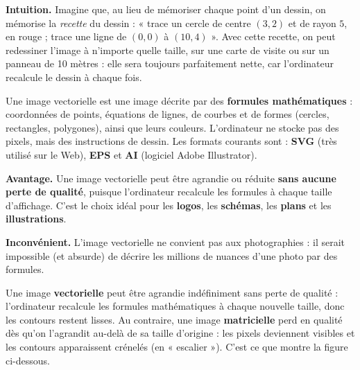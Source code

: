 \documentclass[11pt]{article}
\newcommand{\cle}[1]{{\popxbold\color{popdark}#1}}
\begin{document}
\textbf{Intuition.} Imagine que, au lieu de mémoriser chaque point d'un dessin, on mémorise la \emph{recette} du dessin : « trace un cercle de centre $(3, 2)$ et de rayon $5$, en rouge ; trace une ligne de $(0, 0)$ à $(10, 4)$ ». Avec cette recette, on peut redessiner l'image à n'importe quelle taille, sur une carte de visite ou sur un panneau de 10 mètres : elle sera toujours parfaitement nette, car l'ordinateur recalcule le dessin à chaque fois.

\begin{definition}
Une \cle{image vectorielle} est une image décrite par des \textbf{formules mathématiques} : coordonnées de points, équations de lignes, de courbes et de formes (cercles, rectangles, polygones), ainsi que leurs couleurs. L'ordinateur ne stocke pas des pixels, mais des instructions de dessin. Les formats courants sont : \textbf{SVG} (très utilisé sur le Web), \textbf{EPS} et \textbf{AI} (logiciel Adobe Illustrator).
\end{definition}

\textbf{Avantage.} Une image vectorielle peut être agrandie ou réduite \textbf{sans aucune perte de qualité}, puisque l'ordinateur recalcule les formules à chaque taille d'affichage. C'est le choix idéal pour les \textbf{logos}, les \textbf{schémas}, les \textbf{plans} et les \textbf{illustrations}.

\textbf{Inconvénient.} L'image vectorielle ne convient pas aux photographies : il serait impossible (et absurde) de décrire les millions de nuances d'une photo par des formules.

\begin{propriete}
Une image \textbf{vectorielle} peut être agrandie indéfiniment sans perte de qualité : l'ordinateur recalcule les formules mathématiques à chaque nouvelle taille, donc les contours restent lisses. Au contraire, une image \textbf{matricielle} perd en qualité dès qu'on l'agrandit au-delà de sa taille d'origine : les pixels deviennent visibles et les contours apparaissent crénelés (en « escalier »). C'est ce que montre la figure ci-dessous.
\end{propriete}
\end{document}
